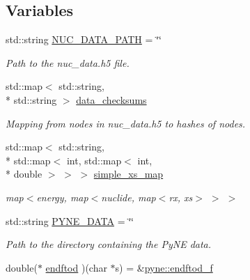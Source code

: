 \subsection*{Variables}
\begin{DoxyCompactItemize}
\item 
\hypertarget{namespacepyne_ac4b3b3dcf295d033b906bf921d820ae2}{std\-::string \hyperlink{namespacepyne_ac4b3b3dcf295d033b906bf921d820ae2}{N\-U\-C\-\_\-\-D\-A\-T\-A\-\_\-\-P\-A\-T\-H} = \char`\"{}\char`\"{}}\label{namespacepyne_ac4b3b3dcf295d033b906bf921d820ae2}

\begin{DoxyCompactList}\small\item\em Path to the nuc\-\_\-data.\-h5 file. \end{DoxyCompactList}\item 
std\-::map$<$ std\-::string, \\*
std\-::string $>$ \hyperlink{namespacepyne_a092bde815498a51a7532e3021a63ede5}{data\-\_\-checksums}
\begin{DoxyCompactList}\small\item\em Mapping from nodes in nuc\-\_\-data.\-h5 to hashes of nodes. \end{DoxyCompactList}\item 
\hypertarget{namespacepyne_a75b3d385906d5d2f078a6d099629a5c8}{std\-::map$<$ std\-::string, \\*
std\-::map$<$ int, std\-::map$<$ int, \\*
double $>$ $>$ $>$ \hyperlink{namespacepyne_a75b3d385906d5d2f078a6d099629a5c8}{simple\-\_\-xs\-\_\-map}}\label{namespacepyne_a75b3d385906d5d2f078a6d099629a5c8}

\begin{DoxyCompactList}\small\item\em map$<$energy, map$<$nuclide, map$<$rx, xs$>$ $>$ $>$ \end{DoxyCompactList}\item 
\hypertarget{namespacepyne_a7927bda45ba222dccef6e43a373b76a6}{std\-::string \hyperlink{namespacepyne_a7927bda45ba222dccef6e43a373b76a6}{P\-Y\-N\-E\-\_\-\-D\-A\-T\-A} = \char`\"{}\char`\"{}}\label{namespacepyne_a7927bda45ba222dccef6e43a373b76a6}

\begin{DoxyCompactList}\small\item\em Path to the directory containing the Py\-N\-E data. \end{DoxyCompactList}\item 
\hypertarget{namespacepyne_aa938a7defc049d691fa6d84aa2c1931e}{double($\ast$ \hyperlink{namespacepyne_aa938a7defc049d691fa6d84aa2c1931e}{endftod} )(char $\ast$s) = \&\hyperlink{namespacepyne_a14e300f1e589b42aaa451bc3cf4c70b8}{pyne\-::endftod\-\_\-f}}\label{namespacepyne_aa938a7defc049d691fa6d84aa2c1931e}


\end{DoxyCompactItemize}
